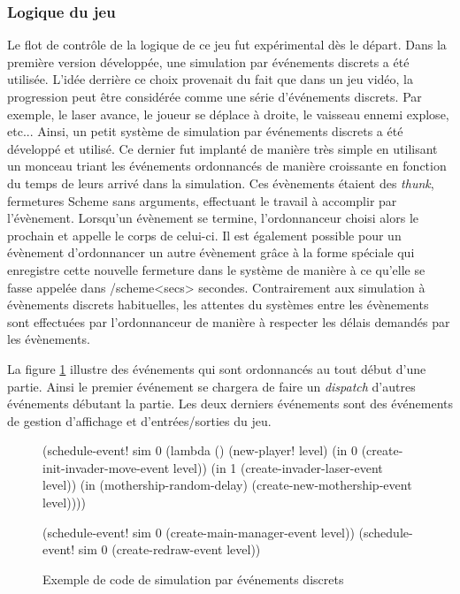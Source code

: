 \documentclass[12pt,oneside,letterpaper,francais]{book}
\newcommand{\scheme}[1]{\selectlanguage{english}{\tt #1}\selectlanguage{french}}
\begin{document}
\subsubsection{Logique du jeu}

Le flot de contrôle de la logique de ce jeu fut expérimental dès le
départ. Dans la première version développée, une simulation par
événements discrets a été utilisée. L'idée derrière ce choix provenait
du fait que dans un jeu vidéo, la progression peut être considérée
comme une série d'événements discrets. Par exemple, le laser avance,
le joueur se déplace à droite, le vaisseau ennemi explose,
etc... Ainsi, un petit système de simulation par événements discrets a
été développé et utilisé. Ce dernier fut implanté de manière très
simple en utilisant un monceau triant les événements ordonnancés de
manière croissante en fonction du temps de leurs arrivé dans la
simulation. Ces évènements étaient des \textit{thunk}, fermetures
Scheme sans arguments, effectuant le travail à accomplir par
l'évènement. Lorsqu'un évènement se termine, l'ordonnanceur choisi
alors le prochain et appelle le corps de celui-ci. Il est également
possible pour un évènement d'ordonnancer un autre évènement grâce à la
forme spéciale \scheme{(in <secs> <thunk>)} qui enregistre cette
nouvelle fermeture dans le système de manière à ce qu'elle se fasse
appelée dans /scheme{<secs>} secondes. Contrairement aux simulation à
évènements discrets habituelles, les attentes du systèmes entre les
évènements sont effectuées par l'ordonnanceur de manière à respecter
les délais demandés par les évènements.

La figure \ref{Exp:des} illustre des événements qui sont ordonnancés
au tout début d'une partie. Ainsi le premier événement se chargera de
faire un \textit{dispatch} d'autres événements débutant la partie. Les
deux derniers événements sont des événements de gestion d'affichage et
d'entrées/sorties du jeu.

\begin{figure}[htb!]
  \begin{schemecode}
(schedule-event! sim 0
  (lambda () (new-player! level)
             (in 0 (create-init-invader-move-event level))
             (in 1 (create-invader-laser-event level))
             (in (mothership-random-delay)
                 (create-new-mothership-event level))))
 
(schedule-event! sim 0 (create-main-manager-event level))
(schedule-event! sim 0 (create-redraw-event level))
  \end{schemecode}
  \caption{Exemple de code de simulation par événements discrets}
  \label{Exp:des}
\end{figure}
\end{document}
